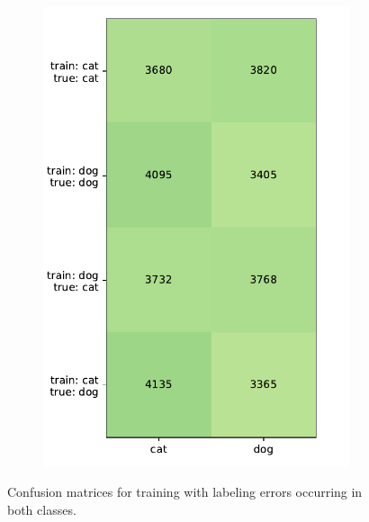 \documentclass[a4paper,11pt]{scrartcl}
\theoremstyle{definition}
\begin{document}
\begin{figure}[H]
\begin{subfigure}[t]{0.32\textwidth}
\includegraphics[width=0.99\textwidth]{Plots_2/compound_3000_50_50_no_Title_same_scale.pdf}
\label{subfig:confusion_50_50}
\end{subfigure}
\caption[Confusion matrices for labeling errors in both classes.]{Confusion matrices for training with labeling errors occurring in both classes.}
\label{fig:crossed_confusion_matrix}
\end{figure}
\end{document}
